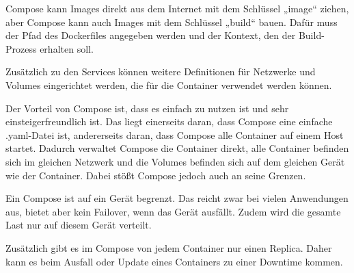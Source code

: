Compose kann Images direkt aus dem Internet mit dem Schlüssel „image“ ziehen, aber Compose kann auch Images mit dem Schlüssel „build“ bauen.
Dafür muss der Pfad des Dockerfiles angegeben werden und der Kontext, den der Build-Prozess erhalten soll.

Zusätzlich zu den Services können weitere Definitionen für Netzwerke und Volumes eingerichtet werden, die für die Container verwendet werden können.

Der Vorteil von Compose ist, dass es einfach zu nutzen ist und sehr einsteigerfreundlich ist.
Das liegt einerseits daran, dass Compose eine einfache .yaml-Datei ist, andererseits daran, dass Compose alle Container auf einem Host startet. Dadurch verwaltet Compose die Container direkt, alle Container befinden sich im gleichen Netzwerk und die Volumes befinden sich auf dem gleichen Gerät wie der Container. 
Dabei stößt Compose jedoch auch an seine Grenzen.

Ein Compose ist auf ein Gerät begrenzt. Das reicht zwar bei vielen Anwendungen aus, bietet aber kein Failover, wenn das Gerät ausfällt.
Zudem wird die gesamte Last nur auf diesem Gerät verteilt. 

Zusätzlich gibt es im Compose von jedem Container nur einen Replica. Daher kann es beim Ausfall oder Update eines Containers zu einer Downtime kommen.
